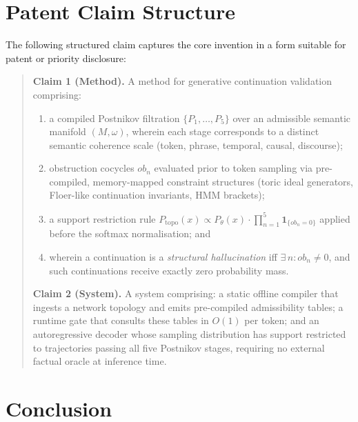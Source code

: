 \documentclass[11pt,a4paper]{article}
\begin{document}
\section{Patent Claim Structure}
\label{sec:patent}

The following structured claim captures the core invention
in a form suitable for patent or priority disclosure:

\begin{quote}
\textbf{Claim 1 (Method).}
A method for generative continuation validation comprising:
\begin{enumerate}[label=(\alph*)]
  \item a compiled Postnikov filtration
        $\{P_1,\ldots,P_5\}$ over an admissible semantic manifold
        $(M,\omega)$, wherein each stage corresponds to a distinct
        semantic coherence scale (token, phrase, temporal, causal,
        discourse);
  \item obstruction cocycles $ob_n$ evaluated prior to token
        sampling via pre-compiled, memory-mapped constraint
        structures (toric ideal generators, Floer-like continuation
        invariants, HMM brackets);
  \item a support restriction rule
        $P_{\mathrm{topo}}(x) \propto P_\theta(x)
        \cdot \prod_{n=1}^{5}\mathbf{1}_{\{ob_n=0\}}$
        applied before the softmax normalisation; and
  \item wherein a continuation is a \emph{structural hallucination}
        iff $\exists\,n: ob_n \neq 0$, and such continuations
        receive exactly zero probability mass.
\end{enumerate}

\textbf{Claim 2 (System).}
A system comprising: a static offline compiler that ingests a
network topology and emits pre-compiled admissibility tables;
a runtime gate that consults these tables in $O(1)$ per token;
and an autoregressive decoder whose sampling distribution has
support restricted to trajectories passing all five Postnikov
stages, requiring no external factual oracle at inference time.
\end{quote}

\section{Conclusion}
\end{document}
